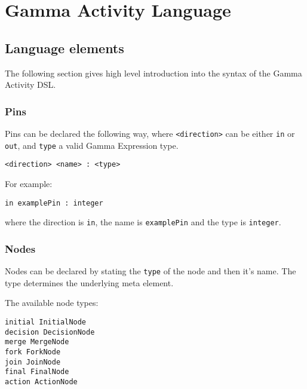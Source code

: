 \clearpage\section{Gamma Activity Language}\label{sec:gamma-activity-language-constructs}

\subsection*{Language elements}

The following section gives high level introduction into the syntax of the Gamma Activity DSL.

\subsubsection*{Pins}\label{sssec:pins}

Pins can be declared the following way, where \verb|<direction>| can be either \verb|in| or \verb|out|, and \verb|type| a valid Gamma Expression type.

\begin{lstlisting}[language=activity]
<direction> <name> : <type>
\end{lstlisting}

For example: 

\begin{lstlisting}[language=activity]
in examplePin : integer
\end{lstlisting}

where the direction is \verb|in|, the name is \verb|examplePin| and the type is \verb|integer|.

\subsubsection*{Nodes}\label{sssec:nodes}

Nodes can be declared by stating the \verb|type| of the node and then it's name. The type determines the underlying meta element.

The available node types:

\begin{lstlisting}[language=activity]
initial InitialNode
decision DecisionNode
merge MergeNode
fork ForkNode
join JoinNode
final FinalNode
action ActionNode
\end{lstlisting}

